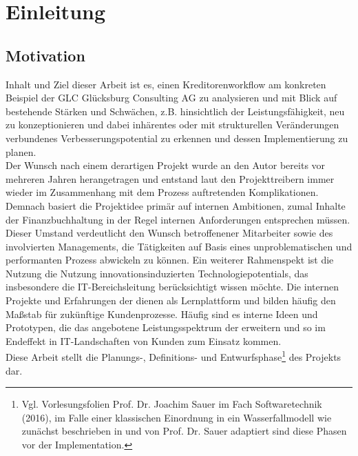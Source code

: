 \chapter{Einleitung}

\section{Motivation}

Inhalt und Ziel dieser Arbeit ist es, einen Kreditorenworkflow am konkreten Beispiel der GLC Glücksburg Consulting AG zu analysieren und mit Blick auf bestehende Stärken und Schwächen, z.B. hinsichtlich der Leistungsfähigkeit, neu zu konzeptionieren und dabei inhärentes oder mit strukturellen Veränderungen verbundenes Verbesserungspotential zu erkennen und dessen Implementierung zu planen.\\
Der Wunsch nach einem derartigen Projekt wurde an den Autor bereits vor mehreren Jahren herangetragen und entstand laut den Projekttreibern immer wieder im Zusammenhang mit dem Prozess auftretenden Komplikationen. \\
Demnach basiert die Projektidee primär auf internen Ambitionen, zumal Inhalte der Finanzbuchhaltung in der Regel internen Anforderungen entsprechen müssen.
Dieser Umstand verdeutlicht den Wunsch betroffenener Mitarbeiter sowie des involvierten Managements, die Tätigkeiten auf Basis eines unproblematischen und performanten Prozess abwickeln zu können.
Ein weiterer Rahmenspekt ist die Nutzung die Nutzung innovationsinduzierten Technologiepotentials, das insbesondere die IT-Bereichsleitung berücksichtigt wissen möchte. 
Die internen Projekte und Erfahrungen der \firma dienen als Lernplattform und bilden häufig den Maßstab für zukünftige Kundenprozesse.
Häufig sind es interne Ideen und Prototypen, die das angebotene Leistungsspektrum der \firma erweitern und so im Endeffekt in IT-Landschaften von Kunden zum Einsatz kommen.\\
Diese Arbeit stellt die Planungs-, Definitions- und Entwurfsphase\footnote{Vgl. Vorlesungsfolien Prof. Dr. Joachim Sauer im Fach Softwaretechnik (2016), im Falle einer klassischen Einordnung in ein Wasserfallmodell wie zunächst beschrieben in \cite{united1956symposium} und von Prof. Dr. Sauer adaptiert sind diese Phasen vor der Implementation. } des Projekts dar.




